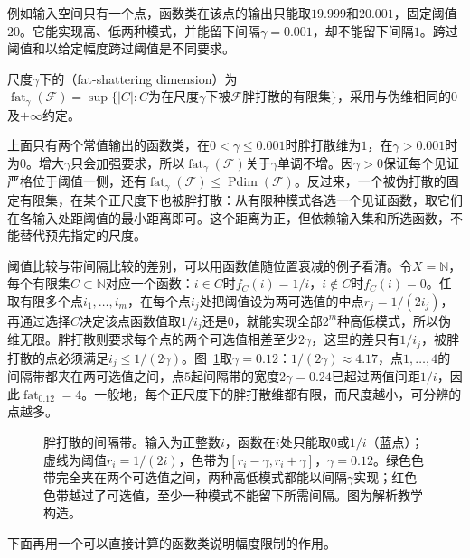 例如输入空间只有一个点，函数类在该点的输出只能取$19.999$和$20.001$，固定阈值$20$。它能实现高、低两种模式，并能留下间隔$\gamma=0.001$，却不能留下间隔$1$。跨过阈值和以给定幅度跨过阈值是不同要求。

\begin{definition}[胖打散维]
\label{def:fat-shattering-dimension}
尺度$\gamma$下的（fat-shattering dimension）为$\operatorname{fat}_\gamma(\mathcal F)=\sup\{|C|:C\text{为在尺度}\gamma\text{下被}\mathcal F\text{胖打散的有限集}\}$，采用与伪维相同的$0$及$+\infty$约定。
\end{definition}

上面只有两个常值输出的函数类，在$0<\gamma\leq0.001$时胖打散维为$1$，在$\gamma>0.001$时为$0$。增大$\gamma$只会加强要求，所以$\operatorname{fat}_\gamma(\mathcal F)$关于$\gamma$单调不增。因$\gamma>0$保证每个见证严格位于阈值一侧，还有$\operatorname{fat}_\gamma(\mathcal F)\leq\operatorname{Pdim}(\mathcal F)$。反过来，一个被伪打散的固定有限集，在某个正尺度下也被胖打散：从有限种模式各选一个见证函数，取它们在各输入处距阈值的最小距离即可。这个距离为正，但依赖输入集和所选函数，不能替代预先指定的尺度。

阈值比较与带间隔比较的差别，可以用函数值随位置衰减的例子看清。令$X=\mathbb N$，每个有限集$C\subset\mathbb N$对应一个函数：$i\in C$时$f_C(i)=1/i$，$i\notin C$时$f_C(i)=0$。任取有限多个点$i_1,\ldots,i_m$，在每个点$i_j$处把阈值设为两可选值的中点$r_j=1/(2i_j)$，再通过选择$C$决定该点函数值取$1/i_j$还是$0$，就能实现全部$2^m$种高低模式，所以伪维无限。胖打散则要求每个点的两个可选值相差至少$2\gamma$，这里的差只有$1/i_j$，被胖打散的点必须满足$i_j\leq1/(2\gamma)$。图~\ref{fig:lt7a-fat-shattering-bands}取$\gamma=0.12$：$1/(2\gamma)\approx4.17$，点$1,\ldots,4$的间隔带都夹在两可选值之间，点$5$起间隔带的宽度$2\gamma=0.24$已超过两值间距$1/i$，因此$\operatorname{fat}_{0.12}=4$。一般地，每个正尺度下的胖打散维都有限，而尺度越小，可分辨的点越多。

\begin{figure}[htbp]
 \centering
 
 \caption{胖打散的间隔带。输入为正整数$i$，函数在$i$处只能取$0$或$1/i$（蓝点）；虚线为阈值$r_i=1/(2i)$，色带为$[r_i-\gamma,r_i+\gamma]$，$\gamma=0.12$。绿色色带完全夹在两个可选值之间，两种高低模式都能以间隔$\gamma$实现；红色色带越过了可选值，至少一种模式不能留下所需间隔。图为解析教学构造。}
 \label{fig:lt7a-fat-shattering-bands}
\end{figure}

下面再用一个可以直接计算的函数类说明幅度限制的作用。


